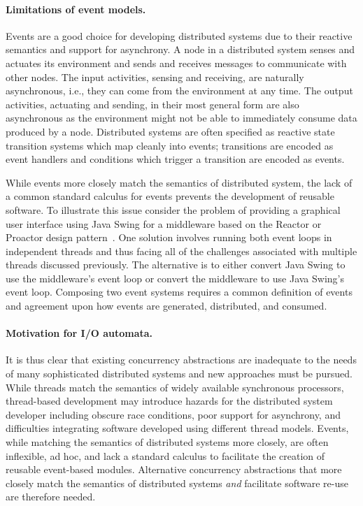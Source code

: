 \paragraph{Limitations of event models.}
Events are a good choice for developing distributed systems due to their reactive semantics and support for asynchrony.
A node in a distributed system senses and actuates its environment and sends and receives messages to communicate with other nodes.
The input activities, sensing and receiving, are naturally asynchronous, i.e., they can come from the environment at any time.
The output activities, actuating and sending, in their most general form are also asynchronous as the environment might not be able to immediately consume data produced by a node.
Distributed systems are often specified as reactive state transition systems which map cleanly into events; transitions are encoded as event handlers and conditions which trigger a transition are encoded as events.

While events more closely match the semantics of distributed system, the lack of a common standard calculus for events prevents the development of reusable software.
To illustrate this issue consider the problem of providing a graphical user interface using Java Swing for a middleware based on the Reactor or Proactor design pattern~\cite{schmidt2000pattern}.
One solution involves running both event loops in independent threads and thus facing all of the challenges associated with multiple threads discussed previously.
The alternative is to either convert Java Swing to use the middleware's event loop or convert the middleware to use Java Swing's event loop.
Composing two event systems requires a common definition of events and agreement upon how events are generated, distributed, and consumed.

\paragraph{Motivation for I/O automata.}
It is thus clear that existing concurrency abstractions are inadequate to the needs of many sophisticated distributed systems and new approaches must be pursued.
While threads match the semantics of widely available synchronous processors, thread-based development may introduce hazards for the distributed system developer including obscure race conditions, poor support for asynchrony, and difficulties integrating software developed using different thread models.
Events, while matching the semantics of distributed systems more closely, are often inflexible, ad hoc, and lack a standard calculus to facilitate the creation of reusable event-based modules.
Alternative concurrency abstractions that more closely match the semantics of distributed systems \emph{and} facilitate software re-use are therefore needed.

